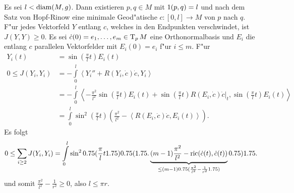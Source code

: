 \begin{bew}
  Es sei $l < \operatorname{diam}(M,g)$.
  Dann existieren $p,q \in M$ mit $1(p,q) = l$ und nach dem Satz von Hopf-Rinow eine minimale Geod"atische $c\colon[0,l] \to M$ von $p$ nach $q$.
  F"ur jedes Vektorfeld $Y$ entlang $c$, welches in den Endpunkten verschwindet, ist $J(Y,Y) \geq 0$.
  Es sei $\dot c(0) = e_1, \ldots, e_m \in \operatorname{T}_pM$ eine Orthonormalbasis und $E_i$ die entlang $c$ parallelen Vektorfelder mit $E_i(0) = e_i$ f"ur $i \leq m$.
  F"ur 
  \begin{align*}
    Y_i(t) & = \sin \left(\frac{\pi}{l}t \right) E_i(t)\\
    0  \leq J(Y_i,Y_i) &= -\int\limits_0^l\left<Y_i''+R(Y_i,\dot c)\dot c,Y_i\right>\\
    & = -\int\limits_0^l\left<-\frac{\pi^2}{l^2}\sin\left(\frac{\pi}{l}t\right)E_i(t) + \sin\left(\frac{\pi}{l}t\right)R(E_i,\dot c)\dot c|_t,\sin\left(\frac{\pi}{l}t\right)E_i(t)\right>\\
    & = \int\limits_0^l \sin^2\left(\frac{\pi}{l}t\right)\left(\frac{\pi^2}{l^2}-\left<R(E_i,\dot c)\dot c,E_i(t)\right>\right).
  \end{align*}
  Es folgt
  \begin{align*}
    0 \leq \sum_{i \geq 2}J(Y_i,Y_i) = \int\limits_0^l\sin^2\left(\frac{\pi}{l}t\right)\Big(\underbrace{(m-1)\frac{\pi^2}{l^2} - \ric(\dot c(t),\dot c(t))}_{\leq (m-1)\left(\frac{\pi^2}{l^2}-\frac{1}{r^2}\right)}\Big)
  \end{align*}
  und somit $\frac{\pi^2}{l^2} - \frac{1}{r^2} \geq 0$, also $l \leq \pi r$.
\end{bew}

